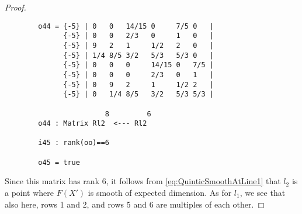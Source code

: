 \begin{proof}
\begin{verbatim}
		o44 = {-5} | 0   0   14/15 0     7/5 0   |
		      {-5} | 0   0   2/3   0     1   0   |
		      {-5} | 9   2   1     1/2   2   0   |
		      {-5} | 1/4 8/5 3/2   5/3   5/3 0   |
		      {-5} | 0   0   0     14/15 0   7/5 |
		      {-5} | 0   0   0     2/3   0   1   |
		      {-5} | 0   9   2     1     1/2 2   |
		      {-5} | 0   1/4 8/5   3/2   5/3 5/3 |
		
		                8         6
		o44 : Matrix Rl2  <--- Rl2
		
		i45 : rank(oo)==6
		
		o45 = true
	\end{verbatim}
	Since this matrix has rank 6, it follows from \eqref{eq:QuinticSmoothAtLine1} that $l_2$ is a point where $F(X')$ is smooth of expected dimension. As for $l_1$, we see that also here, rows 1 and 2, and rows 5 and 6 are multiples of each other.
\end{proof}